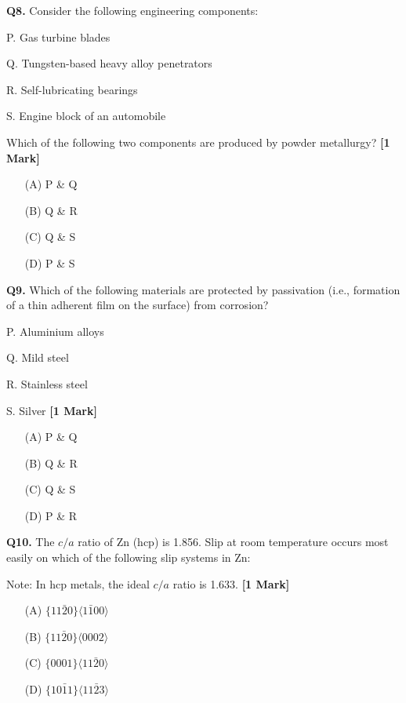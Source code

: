 \documentclass[11pt]{article}
\newcommand{\questiona}[2]{
    \noindent\textbf{Q#2.} #1 \hfill \textbf{[1 Mark]}
}
\begin{document}
\questiona{Consider the following engineering components:  

P. Gas turbine blades  

Q. Tungsten-based heavy alloy penetrators  

R. Self-lubricating bearings  

S. Engine block of an automobile  

Which of the following two components are produced by powder metallurgy?}{8}
\begin{enumerate}
    \item[(A)] P \& Q  
    \item[(B)] Q \& R  
    \item[(C)] Q \& S  
    \item[(D)] P \& S  
\end{enumerate}
\vspace{0.5cm}

\questiona{Which of the following materials are protected by passivation (i.e., formation of a thin adherent film on the surface) from corrosion?  

P. Aluminium alloys  

Q. Mild steel  

R. Stainless steel  

S. Silver}{9}
\begin{enumerate}
    \item[(A)] P \& Q  
    \item[(B)] Q \& R  
    \item[(C)] Q \& S  
    \item[(D)] P \& R  
\end{enumerate}
\vspace{0.5cm}

\questiona{The \(c/a\) ratio of Zn (hcp) is 1.856. Slip at room temperature occurs most easily on which of the following slip systems in Zn:  

Note: In hcp metals, the ideal \(c/a\) ratio is 1.633.}{10}
\begin{enumerate}
    \item[(A)] \(\{11\bar{2}0\} \langle 1\bar{1}00 \rangle\)  
    \item[(B)] \(\{11\bar{2}0\} \langle 0002 \rangle\)  
    \item[(C)] \(\{0001\} \langle 11\bar{2}0 \rangle\)  
    \item[(D)] \(\{10\bar{1}1\} \langle 11\bar{2}3 \rangle\)  
\end{enumerate}
\vspace{0.5cm}
\end{document}
